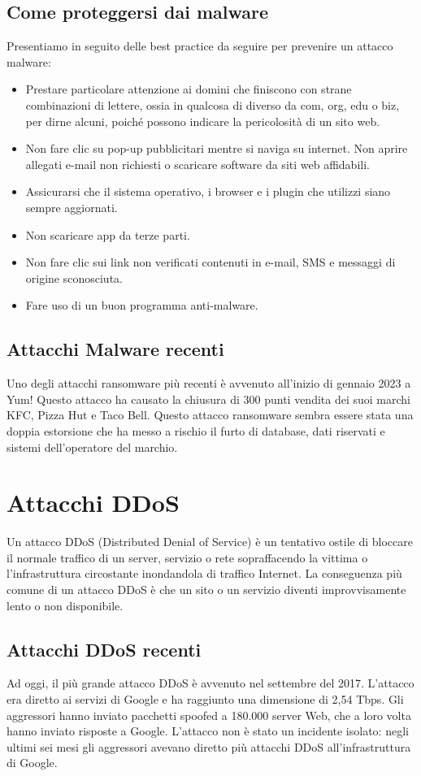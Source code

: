 \subsection{Come proteggersi dai malware}
Presentiamo in seguito delle best practice da seguire per prevenire un attacco malware:
\begin{itemize}
    \item Prestare particolare attenzione ai domini che finiscono con strane combinazioni di lettere, ossia in qualcosa di diverso da com, org, edu o biz, per dirne alcuni, poiché possono indicare la pericolosità di un sito web.
    \item Non fare clic su pop-up pubblicitari mentre si naviga su internet. Non aprire allegati e-mail non richiesti o scaricare software da siti web affidabili.
    \item Assicurarsi che il sistema operativo, i browser e i plugin che utilizzi siano sempre aggiornati.
    \item Non scaricare app da terze parti.
    \item Non fare clic sui link non verificati contenuti in e-mail, SMS e messaggi di origine sconosciuta.
    \item Fare uso di un buon programma anti-malware. 
\end{itemize}
\subsection{Attacchi Malware recenti}
Uno degli attacchi ransomware più recenti è avvenuto all'inizio di gennaio  2023 a Yum! Questo attacco ha causato la chiusura di 300 punti vendita dei suoi marchi KFC, Pizza Hut e Taco Bell.  
\cite{Malware}
Questo attacco ransomware sembra essere stata una doppia estorsione che ha messo a rischio il furto di database, dati riservati e sistemi dell'operatore del marchio.
\section{Attacchi DDoS}
\cite{attaccoDDOS}
Un attacco DDoS (Distributed Denial of Service) è un tentativo ostile di bloccare il normale traffico di un server, servizio o rete sopraffacendo la vittima o l’infrastruttura circostante inondandola di traffico Internet.
La conseguenza più comune di un attacco DDoS è che un sito o un servizio diventi improvvisamente lento o non disponibile. 
\subsection{Attacchi DDoS recenti}
Ad oggi, il più grande attacco DDoS è avvenuto nel settembre del 2017. L'attacco era diretto ai servizi di Google e ha raggiunto una dimensione di 2,54 Tbps. Gli aggressori hanno inviato pacchetti spoofed a 180.000 server Web, che a loro volta hanno inviato risposte a Google. L'attacco non è stato un incidente isolato: negli ultimi sei mesi gli aggressori avevano diretto più attacchi DDoS all'infrastruttura di Google.
